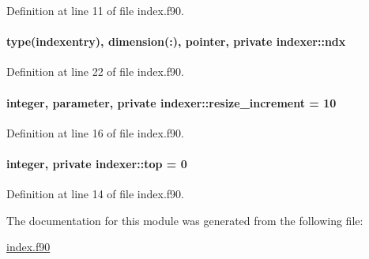 Definition at line 11 of file index.\-f90.

\hypertarget{classindexer_ae39ce8b82040f3e64e2d43a5cad8cc8b}{
\paragraph[{ndx}]{\setlength{\rightskip}{0pt plus 5cm}type({\bf indexentry}), dimension(\-:), pointer, private indexer\-::ndx\hspace{0.3cm}{\ttfamily [private]}}}\label{classindexer_ae39ce8b82040f3e64e2d43a5cad8cc8b}


Definition at line 22 of file index.\-f90.

\hypertarget{classindexer_acddb226545296015b7fa7d7888162da0}{
\paragraph[{resize\-\_\-increment}]{\setlength{\rightskip}{0pt plus 5cm}integer, parameter, private indexer\-::resize\-\_\-increment = 10\hspace{0.3cm}{\ttfamily [private]}}}\label{classindexer_acddb226545296015b7fa7d7888162da0}


Definition at line 16 of file index.\-f90.

\hypertarget{classindexer_a5b67366bbb3cd3d7b2c11f5a988e7b6e}{
\paragraph[{top}]{\setlength{\rightskip}{0pt plus 5cm}integer, private indexer\-::top = 0\hspace{0.3cm}{\ttfamily [private]}}}\label{classindexer_a5b67366bbb3cd3d7b2c11f5a988e7b6e}


Definition at line 14 of file index.\-f90.



The documentation for this module was generated from the following file\-:\begin{DoxyCompactItemize}
\item 
\hyperlink{index_8f90}{index.\-f90}\end{DoxyCompactItemize}
